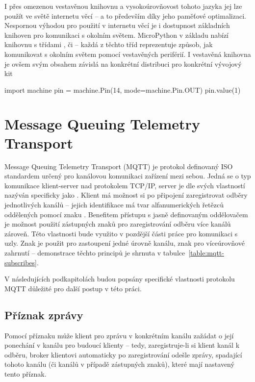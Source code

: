 I přes omezenou vestavěnou knihovnu a vysokoúrovňovost tohoto jazyka jej lze použít ve světě internetu věcí --
a to především díky jeho paměťové optimalizaci.
Nespornou výhodou pro použití v internetu věcí je i dostupnost základních knihoven pro komunikaci s okolním světem.
MicroPython v základu nabízí knihovnu  s třídami ,  či  --
každá z těchto tříd reprezentuje způsob, jak komunikovat s okolním světem pomocí vestavěných periférií.
I vestavěná knihovna je ovšem svým obsahem závislá na konkrétní distribuci pro konkrétní vývojový kit

\begin{code}
    import machine
    pin = machine.Pin(14, mode=machine.Pin.OUT)
    pin.value(1)
\end{code}


\section{Message Queuing Telemetry Transport}\label{sec:message-queuing-telemetry-transport}
Message Queuing Telemetry Transport (MQTT) je protokol definovaný ISO standardem určený pro kanálovou komunikaci zařízení
mezi sebou.
Jedná se o typ komunikace klient-server nad protokolem TCP/IP, server je dle svých vlastností nazýván specificky jako .
Klient má možnost si po připojení zaregistrovat odběry jednotlivých kanálů -- jejich identifikace má tvar
alfanumerických řetězců oddělených pomocí znaku \ic{/}.
Benefitem přístupu s jasně definovaným oddělovačem je možnost použití zástupných znaků pro
zaregistrování odběru více kanálů zároveň.
Této vlastnosti bude využito v pozdější části práce pro komunikaci s uzly.
Znak \ic{+} je použit pro zastoupení jedné úrovně kanálu, znak \ic{#} pro víceúrovňové zahrnutí -- demonstrace těchto
principů je shrnuta v tabulce~\ref{table:mqtt-subscribes}.

V následujících podkapitolách budou popsány specifické vlastnosti protokolu MQTT důležité pro další postup v této
práci.

\subsection{Příznak zprávy }\label{subsec:priznak-zpravy-retain}
Pomocí příznaku  může klient pro zprávu v konkrétním kanálu zažádat o její ponechání v kanálu pro budoucí
klienty -- tedy, zaregistruje-li si klient kanál k odběru, broker klientovi automaticky po zaregistrování odešle zprávy,
spadající tohoto kanálu (či kanálů v případě zástupných znaků), které mají nastavený tento příznak.

